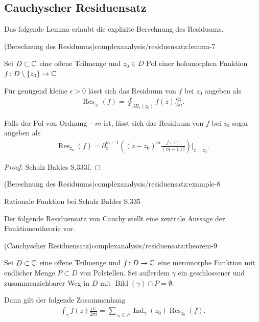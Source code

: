 \subsection{Cauchyscher Residuensatz}
\label{\detokenize{complexanalysis/residuensatz:cauchyscher-residuensatz}}
\par
Das folgende Lemma erlaubt die explizite Berechnung des Residuums.
\begin{lemma}{(Berechnung des Residuums)}{complexanalysis/residuensatz:lemma-7}



\par
Sei \(D \subset \mathbb{C}\) eine offene Teilmenge und \(z_0 \in D\) Pol einer holomorphen Funktion \(f \colon D \setminus \{z_0\} \rightarrow \mathbb{C}\).

\par
Für genügend kleine \(\epsilon > 0\) lässt sich das Residuum von \(f\) bei \(z_0\) angeben als
\begin{align*}
\operatorname{Res}_{z_0}(f) = \oint_{\partial B_\epsilon(z_0)} f(z) \frac{\mathrm{d}z}{2\pi i}.
\end{align*}
\par
Falls der Pol von Ordnung \(-m\) ist, lässt sich das Residuum von \(f\) bei \(z_0\) sogar angeben als
\begin{align*}
\operatorname{Res}_{z_0}(f) = \partial_z^{m-1}\left( (z-z_0)^m \frac{f(z)}{(m-1)!}\right)|_{z=z_0}.
\end{align*}\end{lemma}

\begin{proof}
 Schulz Baldes S.333f.
\end{proof}
\begin{example}{(Berechnung des Residuums)}{complexanalysis/residuensatz:example-8}



\par
Rationale Funktion bei Schulz Baldes S.335
\end{example}

\par
Der folgende Residuensatz von Cauchy stellt eine zentrale Aussage der Funktionentheorie vor.
\begin{theorem}{(Cauchyscher Residuensatz)}{complexanalysis/residuensatz:theorem-9}



\par
Sei \(D \subset \mathbb{C}\) eine offene Teilmenge und \(f \colon D \rightarrow \mathbb{C}\) eine meromorphe Funktion mit endlicher Menge \(P \subset D\) von Polstellen.
Sei außerdem \(\gamma\) ein geschlossener und zusammenziehbarer Weg in \(D\) mit \(\operatorname{Bild}(\gamma) \cap P = \emptyset\).

\par
Dann gilt der folgende Zusammenhang
\begin{align*}
\int_\gamma f(z) \frac{\mathrm{d}z}{2\pi i} = \sum_{z_0 \in P} \operatorname{Ind}_\gamma(z_0) \operatorname{Res}_{z_0}(f).
\end{align*}\end{theorem}

